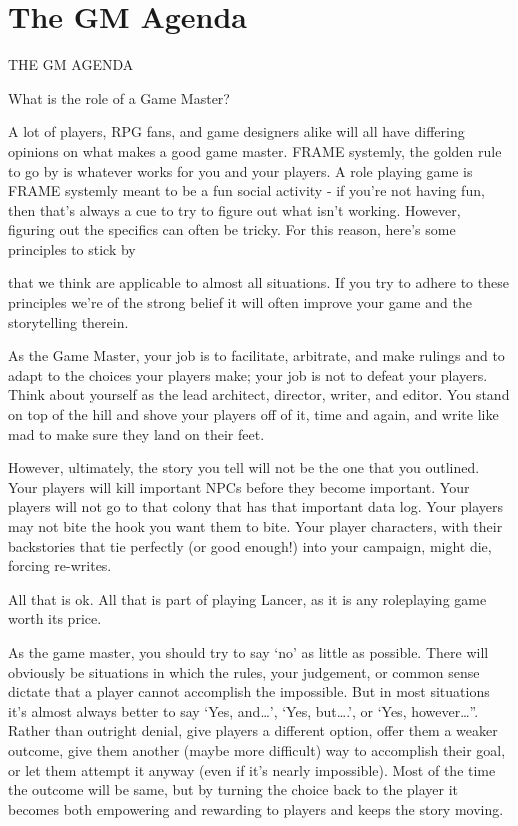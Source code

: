 \section{The GM Agenda}
                                         THE GM AGENDA

What is the role of a Game Master?


A lot of players, RPG fans, and game designers alike will all have differing opinions on what
makes a good game master. FRAME systemly, the golden rule to go by is whatever works for
you and your players. A role playing game is FRAME systemly meant to be a fun social activity -
if you’re not having fun, then that’s always a cue to try to figure out what isn’t working. However,
figuring out the specifics can often be tricky. For this reason, here’s some principles to stick by




that we think are applicable to almost all situations. If you try to adhere to these principles we’re
of the strong belief it will often improve your game and the storytelling therein.


As the Game Master, your job is to facilitate, arbitrate, and make rulings and to adapt to the
choices your players make; your job is not to defeat your players. Think about yourself as the
lead architect, director, writer, and editor. You stand on top of the hill and shove your players off
of it, time and again, and write like mad to make sure they land on their feet.


However, ultimately, the story you tell will not be the one that you outlined. Your players will
kill important NPCs before they become important. Your players will not go to that colony that
has that important data log. Your players may not bite the hook you want them to bite. Your
player characters, with their backstories that tie perfectly (or good enough!) into your campaign,
might die, forcing re-writes.


All that is ok. All that is part of playing Lancer, as it is any roleplaying game worth its price.


As the game master, you should try to say ‘no’ as little as possible. There will obviously be
situations in which the rules, your judgement, or common sense dictate that a player cannot
accomplish the impossible. But in most situations it’s almost always better to say ‘Yes, and…’,
‘Yes, but….’, or ‘Yes, however…”. Rather than outright denial, give players a different option,
offer them a weaker outcome, give them another (maybe more difficult) way to accomplish their
goal, or let them attempt it anyway (even if it’s nearly impossible). Most of the time the outcome
will be same, but by turning the choice back to the player it becomes both empowering and
rewarding to players and keeps the story moving.


